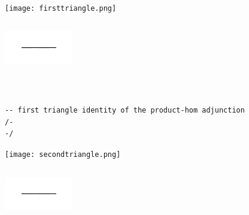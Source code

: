 \documentclass{book}
\newcounter{lcounter}
\begin{document}
\begin{center}
\begin{tcolorbox}[width=5in,colback={white},title={\begin{center}\texttt{Graphic} \addtocounter{lcounter}{1}  \end{center}},colbacktitle=Yellow,coltitle=black]

\begin{center}
\texttt{[image: firsttriangle.png]} \\
\includegraphics[width=3cm,height=3cm]{identity.png} 
\end{center}

\end{tcolorbox}
\end{center}


\begin{center}
\begin{tcolorbox}[width=5in,colback={white},title={\begin{center}\texttt{Lean \thelcounter} \addtocounter{lcounter}{1}  \end{center}},colbacktitle=Blue,coltitle=black]
\begin{verbatim}

-- first triangle identity of the product-hom adjunction
/-
-/

\end{verbatim}%
\end{tcolorbox}
\end{center}


\begin{center}
\begin{tcolorbox}[width=5in,colback={white},title={\begin{center}\texttt{Graphic} \addtocounter{lcounter}{1}  \end{center}},colbacktitle=Yellow,coltitle=black]

\begin{center}
\texttt{[image: secondtriangle.png]} \\
\includegraphics[width=3cm,height=3cm]{identity.png} 
\end{center}

\end{tcolorbox}
\end{center}
\end{document}
